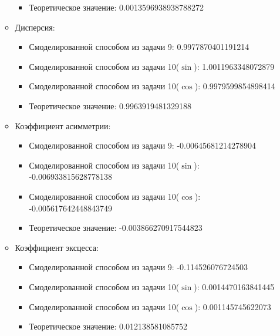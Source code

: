 \documentclass{article}
\begin{document}
\begin{itemize}
\begin{itemize}
\begin{itemize}
		\item Теоретическое значение: 0.0013596938938788272
	\end{itemize}
	\item Дисперсия:
	\begin{itemize}
		\item Смоделированной способом из задачи 9: 0.9977870401191214
		\item Смоделированной способом из задачи 10($\sin$): 1.0011963348072879
		\item Смоделированной способом из задачи 10($\cos$): 0.9979599854898414
		\item Теоретическое значение: 0.9963919481329188
	\end{itemize}
	\item Коэффициент асимметрии:
	\begin{itemize}
		\item Смоделированной способом из задачи 9: -0.00645681214278904
		\item Смоделированной способом из задачи 10($\sin$): -0.006933815628778138
		\item Смоделированной способом из задачи 10($\cos$): -0.005617642448843749
		\item Теоретическое значение: -0.003866270917544823
	\end{itemize}
	\item Коэффициент эксцесса:
	\begin{itemize}
		\item Смоделированной способом из задачи 9: -0.114526076724503
		\item Смоделированной способом из задачи 10($\sin$): 0.0014470163841445
		\item Смоделированной способом из задачи 10($\cos$): 0.001145745622073
		\item Теоретическое значение: 0.012138581085752
	\end{itemize}
\end{itemize}
\end{itemize}
\end{document}
